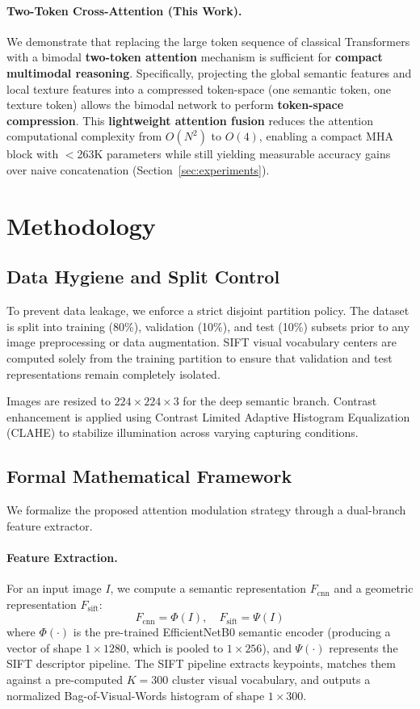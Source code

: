 \documentclass[12pt, a4paper]{article}
\begin{document}
\paragraph{Two-Token Cross-Attention (This Work).}
We demonstrate that replacing the large token sequence of classical Transformers with a bimodal \textbf{two-token attention} mechanism is sufficient for \textbf{compact multimodal reasoning}. Specifically, projecting the global semantic features and local texture features into a compressed token-space (one semantic token, one texture token) allows the bimodal network to perform \textbf{token-space compression}. This \textbf{lightweight attention fusion} reduces the attention computational complexity from $O(N^2)$ to $O(4)$, enabling a compact MHA block with $<$263K parameters while still yielding measurable accuracy gains over naive concatenation (Section~\ref{sec:experiments}).

\section{Methodology}
\label{sec:method}

\subsection{Data Hygiene and Split Control}
To prevent data leakage, we enforce a strict disjoint partition policy. The dataset is split into training (80\%), validation (10\%), and test (10\%) subsets prior to any image preprocessing or data augmentation. SIFT visual vocabulary centers are computed solely from the training partition to ensure that validation and test representations remain completely isolated. 

Images are resized to $224 \times 224 \times 3$ for the deep semantic branch. Contrast enhancement is applied using Contrast Limited Adaptive Histogram Equalization (CLAHE) to stabilize illumination across varying capturing conditions.

\subsection{Formal Mathematical Framework}
We formalize the proposed attention modulation strategy through a dual-branch feature extractor.

\paragraph{Feature Extraction.} For an input image $I$, we compute a semantic representation $F_{\text{cnn}}$ and a geometric representation $F_{\text{sift}}$:
\begin{equation}
F_{\text{cnn}} = \Phi(I), \quad F_{\text{sift}} = \Psi(I)
\label{eq:feat_extract}
\end{equation}
where $\Phi(\cdot)$ is the pre-trained EfficientNetB0 semantic encoder (producing a vector of shape $1 \times 1280$, which is pooled to $1 \times 256$), and $\Psi(\cdot)$ represents the SIFT descriptor pipeline. The SIFT pipeline extracts keypoints, matches them against a pre-computed $K=300$ cluster visual vocabulary, and outputs a normalized Bag-of-Visual-Words histogram of shape $1 \times 300$.
\end{document}
